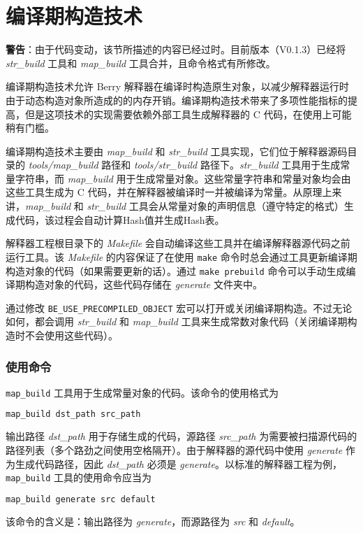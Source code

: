 
\section{编译期构造技术} \label{section::precompiled_build}

\textbf{警告}：由于代码变动，该节所描述的内容已经过时。目前版本（V0.1.3）已经将 \textsl{str\_build} 工具和 \textsl{map\_build} 工具合并，且命令格式有所修改。

编译期构造技术允许 Berry 解释器在编译时构造原生对象，以减少解释器运行时由于动态构造对象所造成的的内存开销。编译期构造技术带来了多项性能指标的提高，但是这项技术的实现需要依赖外部工具生成解释器的 C 代码，在使用上可能稍有门槛。

编译期构造技术主要由 \textsl{map\_build} 和 \textsl{str\_build} 工具实现，它们位于解释器源码目录的 \textsl{tools/map\_build} 路径和 \textsl{tools/str\_build} 路径下。\textsl{str\_build} 工具用于生成常量字符串，而 \textsl{map\_build} 用于生成常量对象。这些常量字符串和常量对象均会由这些工具生成为 C 代码，并在解释器被编译时一并被编译为常量。从原理上来讲，\textsl{map\_build} 和 \textsl{str\_build} 工具会从常量对象的声明信息（遵守特定的格式）生成代码，该过程会自动计算Hash值并生成Hash表。

解释器工程根目录下的 \textsl{Makefile} 会自动编译这些工具并在编译解释器源代码之前运行工具。该 \textsl{Makefile} 的内容保证了在使用 \texttt{make} 命令时总会通过工具更新编译期构造对象的代码（如果需要更新的话）。通过 \texttt{make prebuild} 命令可以手动生成编译期构造对象的代码，这些代码存储在 \textsl{generate} 文件夹中。

通过修改 \texttt{BE\_USE\_PRECOMPILED\_OBJECT} 宏可以打开或关闭编译期构造。不过无论如何，都会调用 \textsl{str\_build} 和 \textsl{map\_build} 工具来生成常数对象代码（关闭编译期构造时不会使用这些代码）。

\subsubsection{使用命令}

\texttt{map\_build} 工具用于生成常量对象的代码。该命令的使用格式为
\begin{lstlisting}[language=bash, numbers=none]
map_build dst_path src_path
\end{lstlisting}
输出路径 \textsl{dst\_path} 用于存储生成的代码，源路径 \textsl{src\_path} 为需要被扫描源代码的路径列表（多个路劲之间使用空格隔开）。由于解释器的源代码中使用 \textsl{generate} 作为生成代码路径，因此 \textsl{dst\_path} 必须是 \textsl{generate}。以标准的解释器工程为例，\texttt{map\_build} 工具的使用命令应当为
\begin{lstlisting}[language=bash, numbers=none]
map_build generate src default
\end{lstlisting}
该命令的含义是：输出路径为 \textsl{generate}，而源路径为 \textsl{src} 和 \textsl{default}。

